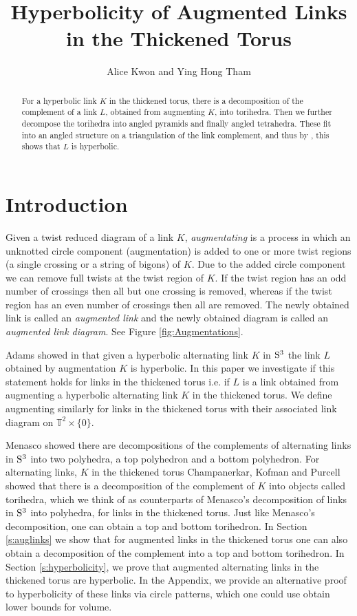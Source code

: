 \documentclass[11pt]{amsart}
\title{Hyperbolicity of Augmented Links in the Thickened Torus}
\author[Alice Kwon and Ying Hong Tham]{Alice Kwon and Ying Hong Tham}
\newcommand{\secref}[1]{Section \ref{#1}}
\newcommand{\Sp}{{\rm{S}}}
\newcommand{\torus}{{\mathbb{T}^2}}
\theoremstyle{plain}
\theoremstyle{definition}
\begin{document}
\maketitle

\begin{abstract}
For a hyperbolic link $K$ in the thickened torus, there is a decomposition of the complement
of a link $L$, obtained from augmenting $K$, into torihedra. Then we further decompose 
the torihedra into angled pyramids and finally angled tetrahedra. These fit into an angled structure 
on a triangulation of the link complement, and thus by \cite{Casson-Rivin}, this shows
that $L$ is hyperbolic.  
\end{abstract}

\section{Introduction}
\label{s:intro}

Given a twist reduced diagram of a link $K$, \emph{augmentating} is a process in
which an unknotted circle component (augmentation) is added to one or
more twist regions (a
single crossing or a string of bigons) of $K$. Due to the added circle component
we can remove full twists at the twist region of $K$. If the twist region has an
odd number of crossings then all but one crossing is removed, whereas if the
twist region has an even number of crossings then all are removed. The newly
obtained link is called an \emph{augmented link} and the newly obtained diagram 
is called an \emph{augmented link diagram}. See Figure \ref{fig:Augmentations}. 

Adams showed in \cite{CA} that given a hyperbolic alternating link $K$ in
$\Sp^3$ the link $L$ obtained by augmentation $K$ is hyperbolic. In this paper
we investigate if this statement holds for links in the thickened torus i.e. if
$L$ is a link obtained from augmenting a hyperbolic alternating link $K$ in the
thickened torus. We define augmenting similarly for links in the thickened torus 
with their associated link diagram on $\torus \times \{0\}.$ 

Menasco \cite{Menasco} showed there are decompositions of the complements of 
alternating links in $\Sp^3$ into two polyhedra, a top polyhedron and a bottom polyhedron. 
For alternating links, $K$ in the thickened torus Champanerkar, Kofman and Purcell \cite{CKP2}
showed that there is a decomposition of the complement of $K$ into objects called torihedra,
which we think of 
as counterparts of Menasco's decomposition of links in $\Sp^3$ into polyhedra, for links in the thickened 
torus. Just like Menasco's decomposition, one can obtain a top and bottom torihedron.
In \secref{s:auglinks} we show that for augmented links in the thickened torus 
one can also obtain a decomposition of the complement into a top and bottom torihedron.
In \secref{s:hyperbolicity}, we prove that augmented alternating links in the thickened torus
are hyperbolic.
In the Appendix, we provide an alternative proof to hyperbolicity of these links
via circle patterns, which one could use obtain lower bounds for volume.
\end{document}
